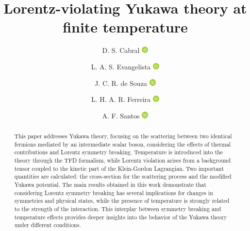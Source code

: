 \documentclass[11pt,showpacs,preprintnumbers,amsmath,amssymb,prd,nofootinbib,superscriptaddress]{revtex4-2}
\newcommand{\orcid}[1]{\href{https://orcid.org/#1}{\includegraphics[width=10pt]{orcid.png}}}
\begin{document}
\title{Lorentz-violating Yukawa theory at finite temperature}

\author{D. S. Cabral  \orcid{0000-0002-7086-5582}}

\author{L. A. S. Evangelista \orcid{0009-0002-3136-2234}}

\author{J. C. R. de Souza \orcid{0000-0002-7684-9540}}

\author{L. H. A. R. Ferreira \orcid{0000-0002-4384-2545}}

\author{A. F. Santos \orcid{0000-0002-2505-5273}}



\begin{abstract}

This paper addresses Yukawa theory, focusing on the scattering between two identical fermions mediated by an intermediate scalar boson, considering the effects of thermal contributions and Lorentz symmetry breaking. Temperature is introduced into the theory through the TFD formalism, while Lorentz violation arises from a background tensor coupled to the kinetic part of the Klein-Gordon Lagrangian. Two important quantities are calculated: the cross-section for the scattering process and the modified Yukawa potential. The main results obtained in this work demonstrate that considering Lorentz symmetry breaking has several implications for changes in symmetries and physical states, while the presence of temperature is strongly related to the strength of the interaction. This interplay between symmetry breaking and temperature effects provides deeper insights into the behavior of the Yukawa theory under different conditions.

\end{abstract}
\end{document}
